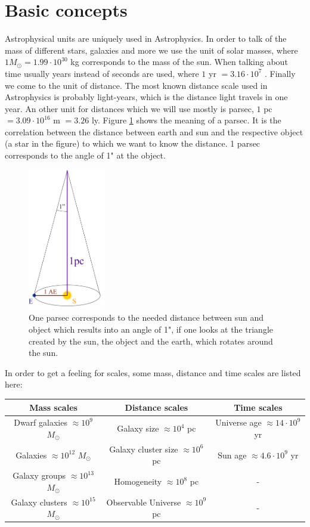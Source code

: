 \section{Basic concepts}
Astrophysical units are uniquely used in Astrophysics. In order to talk of the mass of different stars, galaxies and more we use the unit of solar masses, where $1 M_{\odot} = 1.99 \cdot 10^{30}$ kg corresponds to the mass of the sun. When talking about time usually years instead of seconds are used, where $1$ yr $ = 3.16 \cdot 10^7$ . Finally we come to the unit of distance. The most known distance scale used in Astrophysics is probably light-years, which is the distance light travels in one year. An other unit for distances which we will use mostly is parsec, $1$ pc $ = 3.09 \cdot 10^{16}$ m $ = 3.26$ ly. Figure \ref{fig:parsec} shows the meaning of a parsec. It is the correlation between the distance between earth and sun and the respective object (a star in the figure) to which we want to know the distance. 1 parsec corresponds to the angle of 1" at the object. 
\begin{figure}[H]
	\centering
		\includegraphics[width=0.3\textwidth]{img/ch-01/parsec.png}
		\caption{One parsec corresponds to the needed distance between sun and object which results into an angle of 1", if one looks at the triangle created by the sun, the object and the earth, which rotates around the sun. \cite{parsec}}
		\label{fig:parsec}
\end{figure}
In order to get a feeling for scales, some mass, distance and time scales are listed here:
\begin{table}[H] 
\label{table:scales}
\centering
\begin{tabular}{|c|c|c|}
\hline
Mass scales & Distance scales & Time scales\\
\hline
Dwarf galaxies $\approx 10^9$ $M_\odot$ & Galaxy size $\approx 10^4$ pc &  Universe age $\approx 14\cdot 10^9$ yr\\
\hline
Galaxies $\approx 10^{12}$ $M_\odot$ & Galaxy cluster size $\approx 10^6$ pc & Sun age $\approx 4.6\cdot 10^9$ yr\\
\hline
Galaxy groups $\approx 10^{13}$ $M_\odot$ & Homogeneity $\approx 10^8$ pc & -\\
\hline
Galaxy clusters $\approx 10^{15}$ $M_\odot$ & Observable Universe $\approx 10^9$ pc & -\\
\hline
\end{tabular}
\end{table}
